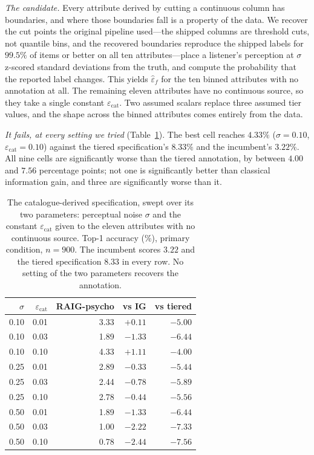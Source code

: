 \emph{The candidate.} Every attribute derived by cutting a continuous column
has boundaries, and where those boundaries fall is a property of the data. We
recover the cut points the original pipeline used---the shipped columns are
threshold cuts, not quantile bins, and the recovered boundaries reproduce the
shipped labels for $99.5\%$ of items or better on all ten attributes---place a
listener's perception at $\sigma$ z-scored standard deviations from the truth,
and compute the probability that the reported label changes. This yields
$\hat\varepsilon_f$ for the ten binned attributes with no annotation at all.
The remaining eleven attributes have no continuous source, so they take a
single constant $\varepsilon_{\text{cat}}$. Two assumed scalars replace three
assumed tier values, and the shape across the binned attributes comes entirely
from the data.

\emph{It fails, at every setting we tried} (Table~\ref{tab:psycho}). The best
cell reaches $4.33\%$ ($\sigma = 0.10$, $\varepsilon_{\text{cat}} = 0.10$)
against the tiered specification's $8.33\%$ and the incumbent's $3.22\%$. All
nine cells are significantly worse than the tiered annotation, by between
$4.00$ and $7.56$ percentage points; not one is significantly better than
classical information gain, and three are significantly worse than it.

\begin{table}[t]
\caption{The catalogue-derived specification, swept over its two parameters:
perceptual noise $\sigma$ and the constant $\varepsilon_{\text{cat}}$ given to
the eleven attributes with no continuous source. Top-1 accuracy (\%), primary
condition, $n = 900$. The incumbent scores $3.22$ and the tiered specification
$8.33$ in every row. No setting of the two parameters recovers the annotation.}
\label{tab:psycho}
\centering
\footnotesize
\begin{tabular}{@{}rrrrr@{}}
\toprule
$\sigma$ & $\varepsilon_{\text{cat}}$ & \textbf{RAIG-psycho} &
\textbf{vs IG} & \textbf{vs tiered} \\
\midrule
0.10 & 0.01 & 3.33 & $+0.11$ & $-5.00$ \\
0.10 & 0.03 & 1.89 & $-1.33$ & $-6.44$ \\
0.10 & 0.10 & 4.33 & $+1.11$ & $-4.00$ \\
0.25 & 0.01 & 2.89 & $-0.33$ & $-5.44$ \\
0.25 & 0.03 & 2.44 & $-0.78$ & $-5.89$ \\
0.25 & 0.10 & 2.78 & $-0.44$ & $-5.56$ \\
0.50 & 0.01 & 1.89 & $-1.33$ & $-6.44$ \\
0.50 & 0.03 & 1.00 & $-2.22$ & $-7.33$ \\
0.50 & 0.10 & 0.78 & $-2.44$ & $-7.56$ \\
\bottomrule
\end{tabular}
\end{table}

